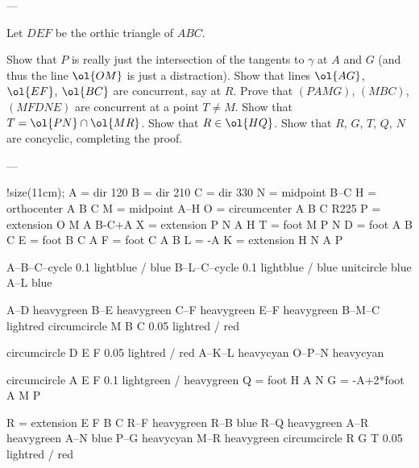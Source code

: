 ---

Let $DEF$ be the orthic triangle of $ABC$.
\begin{walk}
  \ii Show that $P$ is really just the intersection
  of the tangents to $\gamma$ at $A$ and $G$
  (and thus the line $\ol{OM}$ is just a distraction).
  \ii Show that lines $\ol{AG}$, $\ol{EF}$, $\ol{BC}$ are concurrent, say at $R$.
  \ii Prove that $(PAMG)$, $(MBC)$, $(MFDNE)$ are concurrent at a point $T \neq M$.
  \ii Show that $T = \ol{PN} \cap \ol{MR}$.
  \ii Show that $R \in \ol{HQ}$.
  \ii Show that $R$, $G$, $T$, $Q$, $N$ are concyclic, completing the proof.
\end{walk}


---


!size(11cm);
A = dir 120
B = dir 210
C = dir 330
N = midpoint B--C
H = orthocenter A B C
M = midpoint A--H
O = circumcenter A B C R225
P = extension O M A B-C+A
X = extension P N A H
T = foot M P N
D = foot A B C
E = foot B C A
F = foot C A B
L = -A
K = extension H N A P

A--B--C--cycle 0.1 lightblue / blue
B--L--C--cycle 0.1 lightblue / blue
unitcircle blue
A--L blue

A--D heavygreen
B--E heavygreen
C--F heavygreen
E--F heavygreen
B--M--C lightred
circumcircle M B C 0.05 lightred / red

circumcircle D E F 0.05 lightred / red
A--K--L heavycyan
O--P--N heavycyan

circumcircle A E F 0.1 lightgreen / heavygreen
Q = foot H A N
G = -A+2*foot A M P

R = extension E F B C
R--F heavygreen
R--B blue
R--Q heavygreen
A--R heavygreen
A--N blue
P--G heavycyan
M--R heavygreen
circumcircle R G T 0.05 lightred / red
